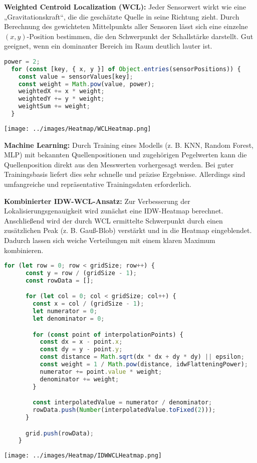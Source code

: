 \textbf{Weighted Centroid Localization (WCL):}  
Jeder Sensorwert wirkt wie eine „Gravitationskraft“, die die geschätzte Quelle in seine Richtung zieht. Durch Berechnung des gewichteten Mittelpunkts aller Sensoren lässt sich eine einzelne $(x,y)$-Position bestimmen, die den Schwerpunkt der Schallstärke darstellt. Gut geeignet, wenn ein dominanter Bereich im Raum deutlich lauter ist.
\begin{lstlisting}[language=JavaScript, caption={Weighted Centroid Localization (WCL)}]
	power = 2;    
  for (const [key, { x, y }] of Object.entries(sensorPositions)) {
    const value = sensorValues[key];
    const weight = Math.pow(value, power);
    weightedX += x * weight;
    weightedY += y * weight;
    weightSum += weight;
  }
\end{lstlisting}
\begin{minipage}[b]{0.5\textwidth}
  \texttt{[image: ../images/Heatmap/WCLHeatmap.png]}
\end{minipage}

\textbf{Machine Learning:}  
Durch Training eines Modells (z. B. KNN, Random Forest, MLP) mit bekannten Quellenpositionen und zugehörigen Pegelwerten kann die Quellenposition direkt aus den Messwerten vorhergesagt werden. Bei guter Trainingsbasis liefert dies sehr schnelle und präzise Ergebnisse. Allerdings sind umfangreiche und repräsentative Trainingsdaten erforderlich.

\textbf{Kombinierter IDW-WCL-Ansatz:}  
Zur Verbesserung der Lokalisierungsgenauigkeit wird zunächst eine IDW-Heatmap berechnet. Anschließend wird der durch WCL ermittelte Schwerpunkt durch einen zusätzlichen Peak (z. B. Gauß-Blob) verstärkt und in die Heatmap eingeblendet. Dadurch lassen sich weiche Verteilungen mit einem klaren Maximum kombinieren.
\begin{lstlisting}[language=JavaScript, caption={Kombinierter IDW-WCL-Ansatz}]
    for (let row = 0; row < gridSize; row++) {
      const y = row / (gridSize - 1);
      const rowData = [];

      for (let col = 0; col < gridSize; col++) {
        const x = col / (gridSize - 1);
        let numerator = 0;
        let denominator = 0;

        for (const point of interpolationPoints) {
          const dx = x - point.x;
          const dy = y - point.y;
          const distance = Math.sqrt(dx * dx + dy * dy) || epsilon;
          const weight = 1 / Math.pow(distance, idwFlatteningPower);
          numerator += point.value * weight;
          denominator += weight;
        }

        const interpolatedValue = numerator / denominator;
        rowData.push(Number(interpolatedValue.toFixed(2)));
      }

      grid.push(rowData);
    }
\end{lstlisting}
\begin{minipage}[b]{0.5\textwidth}
  \texttt{[image: ../images/Heatmap/IDWWCLHeatmap.png]}
\end{minipage}

